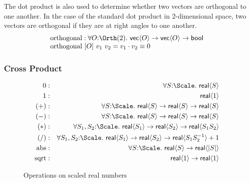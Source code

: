 The dot product is also used to determine whether two vectors are
orthogonal to one another. In the case of the standard dot product in
$2$-dimensional space, two vectors are orthogonal if they are at right
angles to one another.
\begin{displaymath}
  \begin{array}{l}
    \mathrm{orthogonal} : \forall O \mathord: \Orth(2).\ \mathsf{vec}\langle O \rangle \to \mathsf{vec}\langle O \rangle \to \mathsf{bool} \\
    \mathrm{orthogonal}\ [O]\ v_1\ v_2 = v_1 \cdot v_2 \equiv 0
  \end{array}
\end{displaymath}

\subsubsection{Cross Product}

\begin{figure}[t]
  \centering
  \begin{eqnarray*}
    0   &:& \forall S \mathord:\Scale.\ \mathsf{real}\langle S \rangle \\
    1   &:& \mathsf{real}\langle 1 \rangle \\
    (+) &:& \forall S \mathord:\Scale.\ \mathsf{real}\langle S \rangle \to \mathsf{real}\langle S \rangle \to \mathsf{real}\langle S \rangle \\
    (-) &:& \forall S \mathord:\Scale.\ \mathsf{real}\langle S \rangle \to \mathsf{real}\langle S \rangle \to \mathsf{real}\langle S \rangle \\
    (*) &:& \forall S_1,S_2 \mathord:\Scale.\ \mathsf{real}\langle S_1 \rangle \to \mathsf{real}\langle S_2 \rangle \to \mathsf{real}\langle S_1S_2 \rangle \\
    (/) &:& \forall S_1,S_2 \mathord:\Scale.\ \mathsf{real}\langle S_1 \rangle \to \mathsf{real}\langle S_2 \rangle \to \mathsf{real}\langle S_1S_2^{-1} \rangle + 1 \\
    \mathrm{abs} &:& \forall S \mathord:\Scale.\ \mathsf{real}\langle S \rangle \to \mathsf{real}\langle |S| \rangle \\
    \mathrm{sqrt} &:& \mathsf{real}\langle 1 \rangle \to \mathsf{real}\langle 1 \rangle
  \end{eqnarray*}
  \caption{Operations on scaled real numbers}
  \label{fig:real-ops}
\end{figure}

